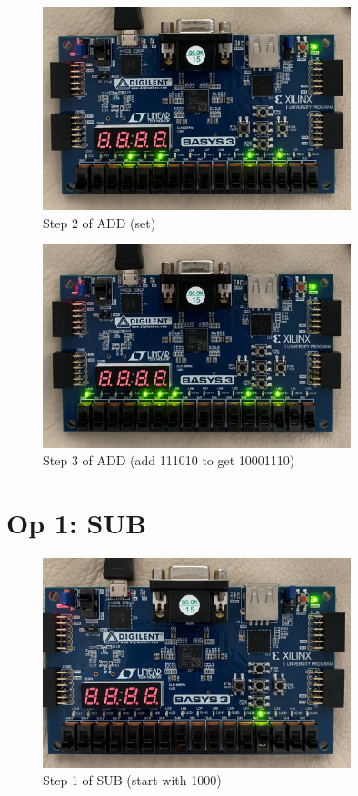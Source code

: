 \documentclass[11pt]{article}
\begin{document}
\begin{figure}[ht]\centering
	\includegraphics[width=0.8\textwidth,trim=0cm 0cm 0cm 0cm,clip]{add_step_2}
	\caption{Step 2 of ADD (set)}
	\label{fig:add_step_2}			
\end{figure}

\begin{figure}[ht]\centering
	\includegraphics[width=0.8\textwidth,trim=0cm 0cm 0cm 0cm,clip]{add_step_3}
	\caption{Step 3 of ADD (add 111010 to get 10001110)}
	\label{fig:add_step_3}			
\end{figure}
\clearpage

\section*{Op 1: SUB}

\begin{figure}[ht]\centering
	\includegraphics[width=0.8\textwidth,trim=0cm 0cm 0cm 0cm,clip]{sub_step_1}
	\caption{Step 1 of SUB (start with 1000)}
	\label{fig:sub_step_1}			
\end{figure}
\end{document}
